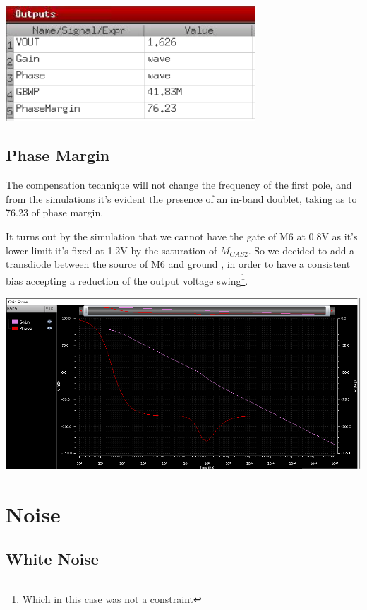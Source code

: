 \centering
\includegraphics[width=0.7\textwidth]{Capitoli/gnp.png}

\raggedright




\subsection{Phase Margin} %
\label{sub:phase_margin}

The compensation technique will not change the frequency of the first pole, and from the simulations it's evident the presence of an in-band doublet, taking as to 76.23 of phase margin.


It turns out by the simulation that we cannot have the gate of M6 at 0.8V as it's lower limit it's fixed at 1.2V by the saturation of $M_{CAS2}$.
So we decided to add a transdiode between the source of M6 and ground , in order to have a consistent bias accepting a reduction of the output voltage swing\footnote{Which in this case was not a constraint}.

\centering
\includegraphics[width=1\textwidth]{Capitoli/gain2.png}
\raggedright


\section{Noise} %
\label{sec:noise}


\subsection{White Noise} %
\label{sub:white_noise}

